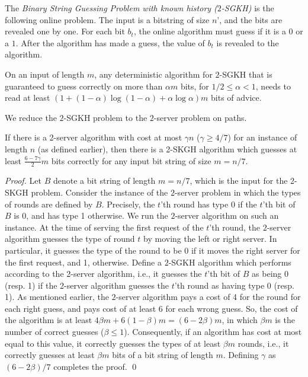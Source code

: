 \begin{definition}
The {\em Binary String Guessing Problem with known history ($2$-SGKH)} is the following online problem. The input is a bitstring of size $n’$, and the bits are revealed one by one. For each bit $b_t$, the online algorithm \alg must guess if it is a $0$ or a $1$. After the algorithm has made a guess, the value of $b_t$ is revealed to the algorithm.
\end{definition}

\begin{lemma} \label{servi}
On an input of length $m$, any deterministic algorithm for $2$-SGKH that is guaranteed to guess correctly on more than $\alpha m$ bits, for $1/2 \leq \alpha < 1$, 
needs to read at least $(1 + (1 - \alpha) \log(1 - \alpha) + \alpha \log \alpha) m$ bits of advice.
\end{lemma}

We reduce the $2$-SGKH problem to the $2$-server problem on paths. 
\begin{lemma}\label{redu1}
If there is a 2-server algorithm with cost at most $\gamma n$ ($\gamma \geq 4/7$) for an instance of length $n$ (as defined earlier), then 
there is a 2-SKGH algorithm which guesses at least $\frac{6-7\gamma}{2} m$ bits correctly for any input bit string of size $m = n/7$.
\end{lemma}

\begin{proof}
Let $B$ denote a bit string of length $m=n/7$, which is the input for the 2-SKGH problem. Consider the instance of the $2$-server problem in which the types of rounds are defined by $B$. Precisely, the $t$'th round has type 0 if the $t$'th bit of $B$ is 0, and has type 1 otherwise. We run the $2$-server algorithm on such an instance. At the time of serving the first request of the $t$'th round, the $2$-server algorithm guesses the type of round $t$ by moving the left or right server. In particular, it guesses the type of the round to be 0 if it moves the right server for the first request, and 1, otherwise. Define a $2$-SGKH algorithm which performs according to the 2-server algorithm, i.e., it guesses the $t$'th bit of $B$ as being 0 (resp. 1) if the 2-server algorithm guesses the $t$'th round as having type 0 (resp. 1). As mentioned earlier, the $2$-server algorithm pays a cost of 4 for the round for each right guess, and pays cost of at least 6 for each wrong guess. So, the cost of the algorithm is at least $4 \beta m + 6 (1-\beta) m = (6 - 2\beta)m$, in which $\beta m$ is the number of correct guesses ($\beta \leq 1$). Consequently, if an algorithm has cost at most equal to this value, it correctly guesses the types of at least $\beta m$ rounds, i.e., it correctly guesses at least $\beta m$ bits of a bit string of length $m$. Defining $\gamma$ as $(6 - 2\beta)/7$ completes the proof. \qed
\end{proof}

